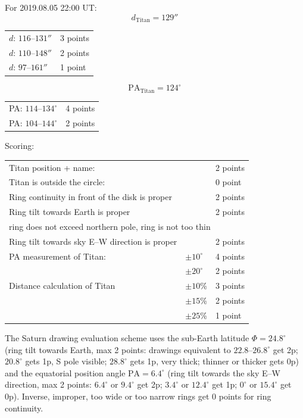 For 2019.08.05 22:00 UT:
\[ d_{\mathrm{Titan}} = 129'' \]
\begin{center}
\begin{tabular}{ll}
$d$: $116$--$131''$ & 3 points \\
$d$: $110$--$148''$ & 2 points \\
$d$: $97$--$161''$ & 1 point \\
\end{tabular}
\end{center}
\[ \mathrm{PA}_{\mathrm{Titan}} = 124^\circ \]
\begin{center}
\begin{tabular}{ll}
PA: $114$--$134^\circ$ & 4 points \\
PA: $104$--$144^\circ$ & 2 points \\
\end{tabular}
\end{center}

\medskip
Scoring:

\begin{center}
\begin{tabular}{lll}
Titan position + name: & & 2 points \\
Titan is outside the circle: & & 0 point \\[4pt]
Ring continuity in front of the disk is proper & & 2 points \\
Ring tilt towards Earth is proper & & 2 points \\
\multicolumn{3}{l}{\quad ring does not exceed northern pole, ring is not too thin} \\
Ring tilt towards sky E--W direction is proper & & 2 points \\[4pt]
PA measurement of Titan: & $\pm 10^\circ$ & 4 points \\
 & $\pm 20^\circ$ & 2 points \\[4pt]
Distance calculation of Titan & $\pm 10$\% & 3 points \\
 & $\pm 15$\% & 2 points \\
 & $\pm 25$\% & 1 point \\
\end{tabular}
\end{center}

The Saturn drawing evaluation scheme uses the sub-Earth latitude
$\Phi = 24.8^\circ$ (ring tilt towards Earth, max 2 points: drawings
equivalent to $22.8$--$26.8^\circ$ get 2p; $20.8^\circ$ gets 1p, S pole
visible; $28.8^\circ$ gets 1p, very thick; thinner or thicker gets 0p) and
the equatorial position angle $\mathrm{PA} = 6.4^\circ$ (ring tilt towards
the sky E--W direction, max 2 points: $6.4^\circ$ or $9.4^\circ$ get 2p;
$3.4^\circ$ or $12.4^\circ$ get 1p; $0^\circ$ or $15.4^\circ$ get 0p).
Inverse, improper, too wide or too narrow rings get 0 points for ring
continuity.

